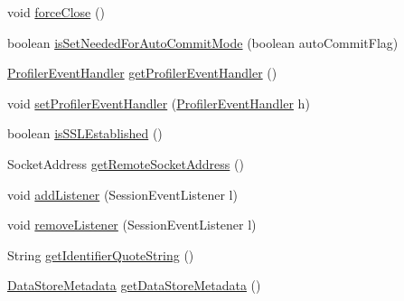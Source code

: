 \begin{DoxyCompactItemize}
\item 
void \mbox{\hyperlink{classcom_1_1mysql_1_1cj_1_1_core_session_a9a0da3cad1f23cae2481b9e8788e4bff}{force\+Close}} ()
\item 
boolean \mbox{\hyperlink{classcom_1_1mysql_1_1cj_1_1_core_session_a126e95932ffb8fdf73b7c4ae4d43972b}{is\+Set\+Needed\+For\+Auto\+Commit\+Mode}} (boolean auto\+Commit\+Flag)
\item 
\mbox{\hyperlink{interfacecom_1_1mysql_1_1cj_1_1log_1_1_profiler_event_handler}{Profiler\+Event\+Handler}} \mbox{\hyperlink{classcom_1_1mysql_1_1cj_1_1_core_session_ada22cc07db1eb2fb753966f8b0e74183}{get\+Profiler\+Event\+Handler}} ()
\item 
void \mbox{\hyperlink{classcom_1_1mysql_1_1cj_1_1_core_session_aaeca771625df6bef13ffa37281b39bad}{set\+Profiler\+Event\+Handler}} (\mbox{\hyperlink{interfacecom_1_1mysql_1_1cj_1_1log_1_1_profiler_event_handler}{Profiler\+Event\+Handler}} h)
\item 
boolean \mbox{\hyperlink{classcom_1_1mysql_1_1cj_1_1_core_session_ae1223b9bea2fae5aa55cc356aab2c079}{is\+S\+S\+L\+Established}} ()
\item 
Socket\+Address \mbox{\hyperlink{classcom_1_1mysql_1_1cj_1_1_core_session_aeab5194dc712d997482f989571df4ab2}{get\+Remote\+Socket\+Address}} ()
\item 
void \mbox{\hyperlink{classcom_1_1mysql_1_1cj_1_1_core_session_a902a4736229fd40f8133480966ebcf3b}{add\+Listener}} (Session\+Event\+Listener l)
\item 
void \mbox{\hyperlink{classcom_1_1mysql_1_1cj_1_1_core_session_a28bc7a6e10e2af13fce4219b7d5557e3}{remove\+Listener}} (Session\+Event\+Listener l)
\item 
String \mbox{\hyperlink{classcom_1_1mysql_1_1cj_1_1_core_session_aaefdfad2df641e33d77e2b53f855afbd}{get\+Identifier\+Quote\+String}} ()
\item 
\mbox{\hyperlink{interfacecom_1_1mysql_1_1cj_1_1_data_store_metadata}{Data\+Store\+Metadata}} \mbox{\hyperlink{classcom_1_1mysql_1_1cj_1_1_core_session_a470a60dea06a09fe2c519aa4ca88faf4}{get\+Data\+Store\+Metadata}} ()
\end{DoxyCompactItemize}
